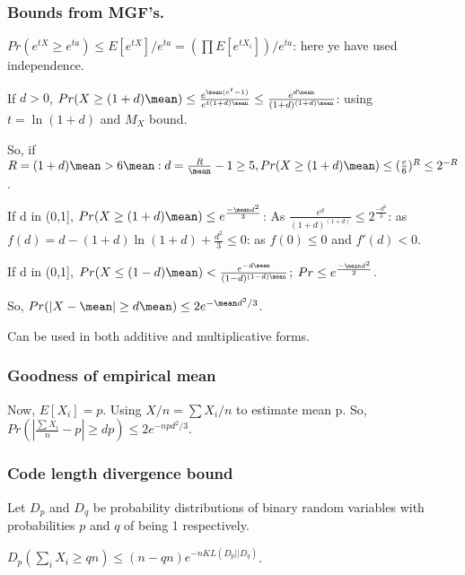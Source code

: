 \documentclass[oneside, article]{memoir}
\begin{document}
\subsubsection{Bounds from MGF's.}
$Pr(e^{tX} \geq e^{ta})\leq E[e^{tX}]/e^{ta} = (\prod E[e^{tX_i}])/ e^{ta}$: here ye have used independence.

If $d>0$, $Pr(X \geq (1+d)\mean) \leq \frac{e^{\mean(e^{t}-1)}}{e^{t(1+d)\mean}} \leq \frac{e^{d\mean}}{(1+d)^{(1+d)\mean}}$: using $t = \ln(1 + d)$ and $M_{X}$ bound.

So, if $R = (1 + d)\mean >6 \mean: d = \frac{R}{\mean} - 1 \geq 5, Pr(X \geq (1 + d) \mean) \leq (\frac{e}{6})^{R} \leq 2^{-R}$.

If d in (0,1], $Pr(X \geq (1+d)\mean) \leq e^{\frac{-\mean d^{2}}{3}}$: As $\frac{e^{d}}{(1+d)^{(1+d)}} \leq 2^{\frac{-d^{2}}{3}}$: as $f(d) = d - (1 + d) \ln (1+d) + \frac{d^{2}}{3}\leq 0$: as $f(0) \leq 0$ and $f'(d) < 0$.

If d in (0,1], $Pr(X \leq (1-d)\mean) < \frac{e^{-d\mean}}{(1-d)^{(1-d)\mean}}$; $Pr \leq e^{\frac{-\mean d^{2}}{2}}$.

So, $Pr(|X-\mean|\geq d\mean) \leq 2e^{-\mean d^{2}/3}$. 

Can be used in both additive and multiplicative forms.

\subsubsection{Goodness of empirical mean}
Now, $E[X_i] = p$. Using $X/n = \sum X_{i}/n$ to estimate mean p. So, $Pr(|\frac{\sum X_{i}}{n}-p|\geq d p) \leq 2e^{-np d^{2}/3}$. 

\subsubsection{Code length divergence bound}
Let $D_p$ and $D_q$ be probability distributions of binary random variables with probabilities $p$ and $q$ of being 1 respectively.

$D_p(\sum_i X_i \geq qn) \leq (n-qn)e^{-n KL(D_p||D_q)}$.

\end{document}
